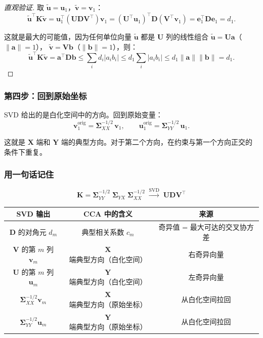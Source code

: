 \begin{proof}[直观验证]
取 $\tilde{\mathbf{u}} = \mathbf{u}_1$，$\tilde{\mathbf{v}} = \mathbf{v}_1$：
\[
    \tilde{\mathbf{u}}^\top \mathbf{K} \tilde{\mathbf{v}}
    = \mathbf{u}_1^\top (\mathbf{U} \mathbf{D} \mathbf{V}^\top) \mathbf{v}_1
    = (\mathbf{U}^\top \mathbf{u}_1)^\top \mathbf{D} (\mathbf{V}^\top \mathbf{v}_1)
    = \mathbf{e}_1^\top \mathbf{D} \mathbf{e}_1
    = d_1.
\]

这就是最大的可能值，因为任何单位向量 $\tilde{\mathbf{u}}$ 都是 $\mathbf{U}$ 列的线性组合 $\tilde{\mathbf{u}} = \mathbf{U}\mathbf{a}$（$\|\mathbf{a}\|=1$），
$\tilde{\mathbf{v}} = \mathbf{V}\mathbf{b}$（$\|\mathbf{b}\|=1$），则：
\[
    \tilde{\mathbf{u}}^\top \mathbf{K} \tilde{\mathbf{v}}
    = \mathbf{a}^\top \mathbf{D} \mathbf{b}
    \le \sum_{i} d_i |a_i b_i|
    \le d_1 \sum_i |a_i b_i|
    \le d_1 \|\mathbf{a}\|\|\mathbf{b}\|
    = d_1.
\]
\end{proof}

\subsubsection{第四步：回到原始坐标}

SVD 给出的是白化空间中的方向。回到原始变量：
\[
    \boxed{\mathbf{v}_1^{\text{orig}} = \bm{\Sigma}_{XX}^{-1/2} \,\mathbf{v}_1},\qquad
    \boxed{\mathbf{u}_1^{\text{orig}} = \bm{\Sigma}_{YY}^{-1/2} \,\mathbf{u}_1}.
\]

这就是 $\mathbf{X}$ 端和 $\mathbf{Y}$ 端的典型方向。对于第二个方向，在约束与第一个方向正交的条件下重复。

\subsubsection{用一句话记住}

\[
\boxed{\mathbf{K} = \bm{\Sigma}_{YY}^{-1/2} \;\bm{\Sigma}_{YX}\; \bm{\Sigma}_{XX}^{-1/2}
      \;\xrightarrow{\text{SVD}}\;
      \mathbf{U} \mathbf{D} \mathbf{V}^\top}
\]

\begin{center}
\begin{tabular}{c|c|c}
\toprule
\textbf{SVD 输出} & \textbf{CCA 中的含义} & \textbf{来源} \\
\midrule
$\mathbf{D}$ 的对角元 $d_m$ & 典型相关系数 $c_m$ & 奇异值 = 最大可达的交叉协方差 \\
$\mathbf{V}$ 的第 $m$ 列 $\mathbf{v}_m$ & $\mathbf{X}$ 端典型方向（白化空间） & 右奇异向量 \\
$\mathbf{U}$ 的第 $m$ 列 $\mathbf{u}_m$ & $\mathbf{Y}$ 端典型方向（白化空间） & 左奇异向量 \\
$\bm{\Sigma}_{XX}^{-1/2}\mathbf{v}_m$ & $\mathbf{X}$ 端典型方向（原始坐标） & 从白化空间拉回 \\
$\bm{\Sigma}_{YY}^{-1/2}\mathbf{u}_m$ & $\mathbf{Y}$ 端典型方向（原始坐标） & 从白化空间拉回 \\
\bottomrule
\end{tabular}
\end{center}

